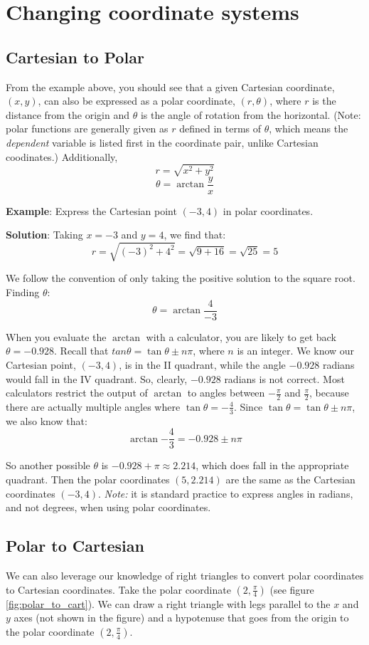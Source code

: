 \section{Changing coordinate systems}

\subsection{Cartesian to Polar}
From the example above, you should see that a given Cartesian coordinate, 
$(x,y)$, can also be expressed as a polar coordinate, $(r, \theta)$, where $r$ 
is the distance from the origin and $\theta$ is the angle of rotation from the 
horizontal. (Note: polar functions are generally given as $r$ defined in terms 
of $\theta$, which means the \textit{dependent} variable is listed first in 
the coordinate pair, unlike Cartesian coodinates.) Additionally, 
$$r = \sqrt{x^2 + y^2}$$
$$\theta = \arctan{\frac{y}{x}}$$

\textbf{Example}: Express the Cartesian point $(-3, 4)$ in polar coordinates. 

\textbf{Solution}: Taking $x = -3$ and $y = 4$, we find that:
$$r = \sqrt{(-3)^2 + 4^2} = \sqrt{9 + 16} = \sqrt{25} = 5$$

We follow the convention of only taking the positive solution to the square 
root. Finding $\theta$:
$$\theta = \arctan{\frac{4}{-3}}$$

When you evaluate the $\arctan$ with a calculator, you are likely to get back 
$\theta = -0.928$. Recall that $tan{\theta} = \tan{\theta \pm n\pi}$, where $n$ 
is an integer. We know our Cartesian point, $(-3, 4)$, is in the II quadrant, 
while the angle $-0.928$ radians would fall in the IV quadrant. So, clearly, 
$-0.928$ radians is not correct. Most calculators restrict the output of 
$\arctan$ to angles between $-\frac{\pi}{2}$ and $\frac{\pi}{2}$, because 
there are actually multiple angles where $\tan{\theta} = -\frac{4}{3}$. Since 
$\tan{\theta} = \tan{\theta \pm n \pi}$, we also know that:
$$\arctan{-\frac{4}{3}} = -0.928 \pm n \pi$$

So another possible $\theta$ is $-0.928 + \pi \approx 2.214$, which does fall 
in the appropriate quadrant. Then the polar coordinates $(5, 2.214)$ are the 
same as the Cartesian coordinates $(-3, 4)$. \textit{Note:} it is standard 
practice to express angles in radians, and not degrees, when using polar 
coordinates. 

\subsection{Polar to Cartesian}
We can also leverage our knowledge of right triangles to convert polar 
coordinates to Cartesian coordinates. Take the polar coordinate $(2, 
\frac{\pi}{4})$ (see figure \ref{fig:polar_to_cart}). We can draw a right 
triangle with legs parallel to the $x$ and $y$ axes (not shown in the figure) 
and a hypotenuse that goes from the origin to the polar coordinate $(2, \frac{
\pi}{4})$. 

